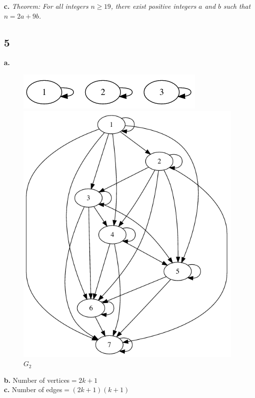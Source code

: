 \documentclass[10pt, twocolumn]{article}
\begin{document}
\textbf{c. } \textit{Theorem: For all integers $n\ge19$, there exist positive integers $a$ and $b$ such that $n=2a+9b$.}
\newpage
\subsection*{5}
\textbf{a. }
\begin{figure}[h]
    \centering
    \includegraphics[width=0.99\linewidth]{i8_1.png}
    \caption{$G_1$}
    \includegraphics[width=1\linewidth]{i8_2.png}
    \caption{$G_2$}
    \label{fig:my_label}
\end{figure}

\textbf{b. } Number of vertices$=2k+1$\\

\textbf{c. } Number of edges$={(2k+1)(k+1)}$
\end{document}
